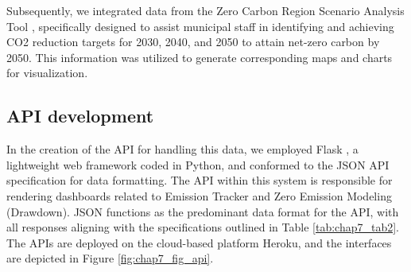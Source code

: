 Subsequently, we integrated data from the Zero Carbon Region Scenario Analysis Tool \citep{zerocarbon}, specifically designed to assist municipal staff in identifying and achieving CO2 reduction targets for 2030, 2040, and 2050 to attain net-zero carbon by 2050. This information was utilized to generate corresponding maps and charts for visualization.\par

\subsection{API development}
In the creation of the API for handling this data, we employed Flask \citep{grinberg2018flask}, a lightweight web framework coded in Python, and conformed to the JSON API specification for data formatting. The API within this system is responsible for rendering dashboards related to Emission Tracker and Zero Emission Modeling (Drawdown). JSON functions as the predominant data format for the API, with all responses aligning with the specifications outlined in Table \ref{tab:chap7_tab2}. The APIs are deployed on the cloud-based platform Heroku, and the interfaces are depicted in Figure \ref{fig:chap7_fig_api}. \par

